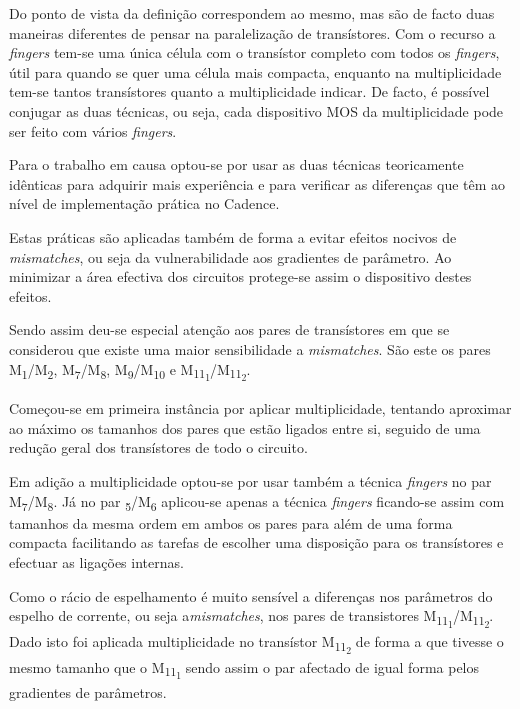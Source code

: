 \documentclass[11pt]{article}
\numberwithin{equation}{section}
\begin{document}
Do ponto de vista da definição correspondem ao mesmo, mas são de facto duas maneiras diferentes de pensar na paralelização de transístores. Com o recurso a \textit{fingers} tem-se uma única célula com o transístor completo com todos os \textit{fingers}, útil para quando se quer uma célula mais compacta, enquanto na multiplicidade tem-se tantos transístores quanto a multiplicidade indicar. De facto, é possível conjugar as duas técnicas, ou seja, cada dispositivo MOS da multiplicidade pode ser feito com vários \textit{fingers}.

Para o trabalho em causa optou-se por usar as duas técnicas teoricamente idênticas para adquirir mais experiência e para verificar as diferenças que têm ao nível de implementação prática no Cadence.

Estas práticas são aplicadas também de forma a evitar  efeitos nocivos de \textit{mismatches}, ou seja da vulnerabilidade aos gradientes de parâmetro. Ao minimizar a área efectiva dos circuitos protege-se assim o dispositivo destes efeitos.

Sendo assim deu-se especial atenção aos pares de transístores em que se considerou que existe uma maior sensibilidade a \textit{mismatches}. São este os pares M\textsubscript{1}/M\textsubscript{2}, M\textsubscript{7}/M\textsubscript{8}, M\textsubscript{9}/M\textsubscript{10} e M\textsubscript{11\textsubscript{1}}/M\textsubscript{11\textsubscript{2}}. 

Começou-se em primeira instância por aplicar multiplicidade, tentando aproximar ao máximo os tamanhos dos pares que estão ligados entre si, seguido de uma redução geral dos transístores de todo o circuito. 


Em adição a multiplicidade optou-se por usar também a técnica \textit{fingers} no par M\textsubscript{7}/M\textsubscript{8}. Já no par \textsubscript{5}/M\textsubscript{6} aplicou-se apenas a técnica \textit{fingers} ficando-se assim com tamanhos da mesma ordem em ambos os pares para além de uma forma compacta facilitando as tarefas de escolher uma disposição para os transístores e efectuar as ligações internas.

Como o rácio de espelhamento é muito sensível a diferenças nos parâmetros do espelho de corrente, ou seja a\textit{mismatches}, nos pares de transistores M\textsubscript{11\textsubscript{1}}/M\textsubscript{11\textsubscript{2}}. Dado isto foi aplicada multiplicidade no transístor M\textsubscript{11\textsubscript{2}} de forma a que tivesse o mesmo tamanho que o M\textsubscript{11\textsubscript{1}} sendo assim o par afectado de igual forma pelos gradientes de parâmetros.
\end{document}
